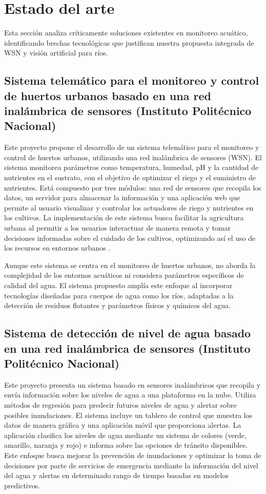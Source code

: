 \chapter{Estado del arte}
Esta sección analiza críticamente soluciones existentes en monitoreo acuático, identificando brechas tecnológicas que justifican nuestra propuesta integrada de WSN y visión artificial para ríos.

\section{Sistema telemático para el monitoreo y control de huertos urbanos basado en una red inalámbrica de sensores (Instituto Politécnico Nacional)}

Este proyecto propone el desarrollo de un sistema telemático para el monitoreo y control de huertos urbanos, utilizando una red inalámbrica de sensores (WSN). El sistema monitorea parámetros como temperatura, humedad, pH y la cantidad de nutrientes en el sustrato, con el objetivo de optimizar el riego y el suministro de nutrientes. Está compuesto por tres módulos: una red de sensores que recopila los datos, un servidor para almacenar la información y una aplicación web que permite al usuario visualizar y controlar los actuadores de riego y nutrientes en los cultivos. La implementación de este sistema busca facilitar la agricultura urbana al permitir a los usuarios interactuar de manera remota y tomar decisiones informadas sobre el cuidado de los cultivos, optimizando así el uso de los recursos en entornos urbanos \cite{benitez2024}.

Aunque este sistema se centra en el monitoreo de huertos urbanos, no aborda la complejidad de los entornos acuáticos ni considera parámetros específicos de calidad del agua. El sistema propuesto amplía este enfoque al incorporar tecnologías diseñadas para cuerpos de agua como los ríos, adaptadas a la detección de residuos flotantes y parámetros físicos y químicos del agua.
\newpage

\section{Sistema de detección de nivel de agua basado en una red inalámbrica de sensores (Instituto Politécnico Nacional)}

Este proyecto presenta un sistema basado en sensores inalámbricos que recopila y envía información sobre los niveles de agua a una plataforma en la nube. Utiliza métodos de regresión para predecir futuros niveles de agua y alertar sobre posibles inundaciones. El sistema incluye un tablero de control que muestra los datos de manera gráfica y una aplicación móvil que proporciona alertas. La aplicación clasifica los niveles de agua mediante un sistema de colores (verde, amarillo, naranja y rojo) e informa sobre las opciones de tránsito disponibles. Este enfoque busca mejorar la prevención de inundaciones y optimizar la toma de decisiones por parte de servicios de emergencia mediante la información del nivel del agua y alertas en determinado rango de tiempo basadas en modelos predictivos\cite{perez2024}.

